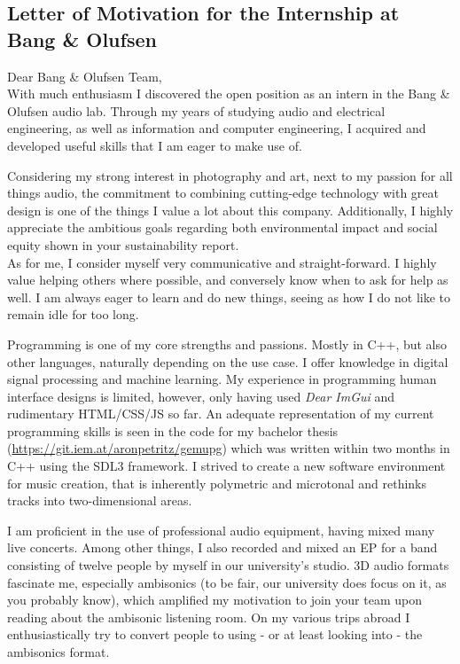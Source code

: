 \documentclass[12pt]{article}
\begin{document}
\begin{center}
	\section*{Letter of Motivation for the Internship at Bang \& Olufsen}
\end{center}
Dear Bang \& Olufsen Team,\\
With much enthusiasm I discovered the open position as an intern in the Bang \& Olufsen audio lab. Through my years of studying audio and electrical engineering, as well as information and computer engineering, I acquired and developed useful skills that I am eager to make use of.

Considering my strong interest in photography and art, next to my passion for all things audio, the commitment to combining cutting-edge technology with great design is one of the things I value a lot about this company.
Additionally, I highly appreciate the ambitious goals regarding both environmental impact and social equity shown in your sustainability report.
\\
As for me, I consider myself very communicative and straight-forward. I highly value helping others where possible, and conversely know when to ask for help as well. I am always eager to learn and do new things, seeing as how I do not like to remain idle for too long.

Programming is one of my core strengths and passions. Mostly in C++, but also other languages, naturally depending on the use case. I offer knowledge in digital signal processing and machine learning. My experience in programming human interface designs is limited, however, only having used \textit{Dear ImGui} and rudimentary HTML/CSS/JS so far. An adequate representation of my current programming skills is seen in the code for my bachelor thesis (\href{https://git.iem.at/aronpetritz/gemupg}{https://git.iem.at/aronpetritz/gemupg}) which was written within two months in C++ using the SDL3 framework. I strived to create a new software environment for music creation, that is inherently polymetric and microtonal and rethinks tracks into two-dimensional areas.

I am proficient in the use of professional audio equipment, having mixed many live concerts. Among other things, I also recorded and mixed an EP for a band consisting of twelve people by myself in our university's studio.
3D audio formats fascinate me, especially ambisonics (to be fair, our university does focus on it, as you probably know), which amplified my motivation to join your team upon reading about the ambisonic listening room. On my various trips abroad I enthusiastically try to convert people to using - or at least looking into - the ambisonics format.
\end{document}

